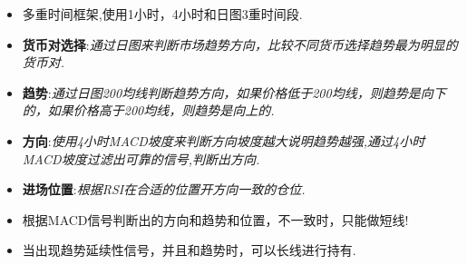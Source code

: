 
%


\begin{itemize}
\item 多重时间框架,使用1小时，4小时和日图3重时间段.
\item \textbf{货币对选择}:\textit{通过日图来判断市场趋势方向，比较不同货币选择趋势最为明显的货币对.}
\item \textbf{趋势}:\textit{通过日图200均线判断趋势方向，如果价格低于200均线，则趋势是向下的，如果价格高于200均线，则趋势是向上的.}
\item \textbf{方向}:\textit{使用4小时MACD坡度来判断方向坡度越大说明趋势越强,通过4小时MACD坡度过滤出可靠的信号,判断出方向.}
\item \textbf{进场位置}:\textit{根据RSI在合适的位置开方向一致的仓位.}
\item 根据MACD信号判断出的方向和趋势和位置，不一致时，只能做短线!
\item 当出现趋势延续性信号，并且和趋势时，可以长线进行持有.
\end{itemize}








